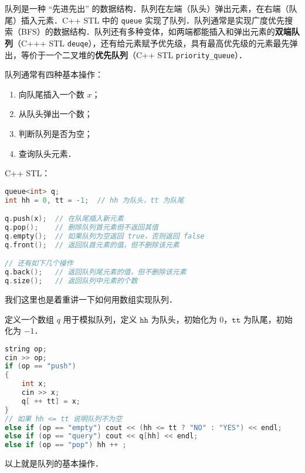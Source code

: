 
队列是一种 “先进先出” 的数据结构．队列在左端（队头）弹出元素，在右端（队尾）插入元素．C++ STL 中的 \verb|queue| 实现了队列．队列通常是实现广度优先搜索（BFS）的数据结构．队列还有多种变体，如两端都能插入和弹出元素的\textbf{双端队列}（C+++ STL \verb|deuqe|），还有给元素赋予优先级，具有最高优先级的元素最先弹出，等价于一个二叉堆的\textbf{优先队列}（C++ STL \verb|priority_queue|）．

队列通常有四种基本操作：

\begin{enumerate}
\item 向队尾插入一个数 $x$；
\item 从队头弹出一个数；
\item 判断队列是否为空；
\item 查询队头元素．
\end{enumerate}

C++ STL：

\begin{lstlisting}[language=cpp]
queue<int> q;
int hh = 0, tt = -1;  // hh 为队头，tt 为队尾

q.push(x);  // 在队尾插入新元素
q.pop();    // 删除队列首元素但不返回其值
q.empty();  // 如果队列为空返回 true，否则返回 false
q.front();  // 返回队首元素的值，但不删除该元素

// 还有如下几个操作
q.back();   // 返回队列尾元素的值，但不删除该元素
q.size();   // 返回队列中元素的个数

\end{lstlisting}

我们这里也是着重讲一下如何用数组实现队列．

定义一个数组 $q$ 用于模拟队列，定义 $\mathtt{hh}$ 为队头，初始化为 $0$，$\mathtt{tt}$ 为队尾，初始化为 $-1$．

\begin{lstlisting}[language=cpp]
string op;
cin >> op;
if (op == "push") 
{
    int x;
    cin >> x;
    q[ ++ tt] = x;
} 
// 如果 hh <= tt 说明队列不为空
else if (op == "empty") cout << (hh <= tt ? "NO" : "YES") << endl;
else if (op == "query") cout << q[hh] << endl;
else if (op == "pop") hh ++ ;
\end{lstlisting}

以上就是队列的基本操作．